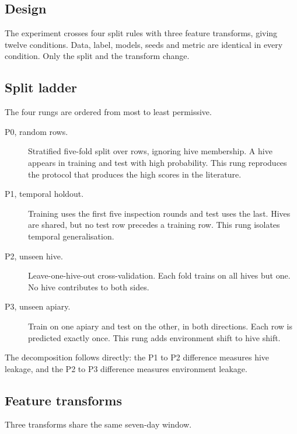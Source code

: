 ﻿\documentclass[review,12pt]{elsarticle}
\begin{document}
\subsection{Design}

The experiment crosses four split rules with three feature transforms, giving
twelve conditions.
Data, label, models, seeds and metric are identical in every condition.
Only the split and the transform change.

\subsection{Split ladder}

The four rungs are ordered from most to least permissive.

\begin{description}
\item[P0, random rows.] Stratified five-fold split over rows, ignoring hive
membership.
A hive appears in training and test with high probability.
This rung reproduces the protocol that produces the high scores in the
literature.

\item[P1, temporal holdout.] Training uses the first five inspection rounds and
test uses the last.
Hives are shared, but no test row precedes a training row.
This rung isolates temporal generalisation.

\item[P2, unseen hive.] Leave-one-hive-out cross-validation.
Each fold trains on all hives but one.
No hive contributes to both sides.

\item[P3, unseen apiary.] Train on one apiary and test on the other, in both
directions.
Each row is predicted exactly once.
This rung adds environment shift to hive shift.
\end{description}

The decomposition follows directly:
the P1 to P2 difference measures hive leakage,
and the P2 to P3 difference measures environment leakage.

\subsection{Feature transforms}

Three transforms share the same seven-day window.
\end{document}
